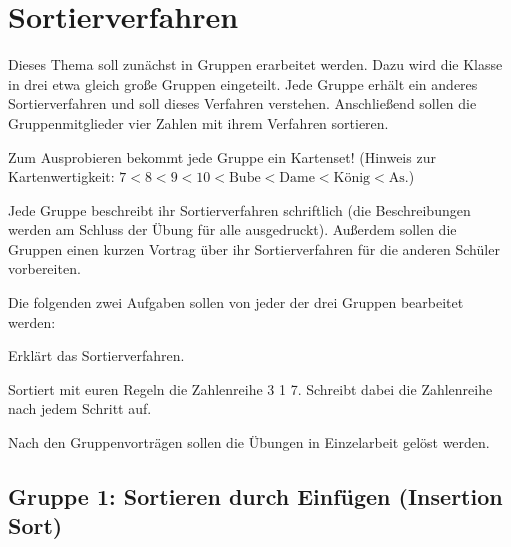 \chapter{Sortierverfahren \tagZusatz}
\renewcommand{\chaptertitle}{Sortierverfahren}

\lehead[]{\normalfont\sffamily\hspace*{-2.00cm}\textcolor{white}{\colorbox{lightblue}{\makebox[1.60cm][r]{\thechapter}}}\hspace{0.17cm}\textcolor{lightblue}{\chaptertitle}}
\rohead[]{\textcolor{lightblue}{\chaptertitle}\normalfont\sffamily\hspace*{0.17cm}\textcolor{white}{\colorbox{lightblue}{\makebox[1.60cm][l]{\thechapter}}}\hspace{-2.00cm}}
\rehead[]{\textcolor{lightblue}{AvHG, Inf, My}}
\lohead[]{\textcolor{lightblue}{AvHG, Inf, My}}

\lstset{style=myJava}

Dieses Thema soll zunächst in Gruppen erarbeitet werden. Dazu wird die Klasse in
drei etwa gleich große Gruppen eingeteilt. Jede Gruppe erhält ein anderes
Sortierverfahren und soll dieses Verfahren verstehen. Anschließend sollen die
Gruppenmitglieder vier Zahlen mit ihrem Verfahren sortieren.

Zum Ausprobieren bekommt jede Gruppe ein Kartenset! (Hinweis zur
Kartenwertigkeit: $7 < 8 < 9 < 10 < \text{Bube} < \text{Dame} < \text{König} < \text{As}$.)

Jede Gruppe beschreibt ihr Sortierverfahren schriftlich (die Beschreibungen
werden am Schluss der Übung für alle ausgedruckt). Außerdem sollen die Gruppen
einen kurzen Vortrag über ihr Sortierverfahren für die anderen Schüler
vorbereiten.

Die folgenden zwei Aufgaben sollen von jeder der drei Gruppen bearbeitet werden:

\begin{compactenum}[a)]
\item Erklärt das Sortierverfahren.
\item Sortiert mit euren Regeln die Zahlenreihe  3 1 7\grqq . Schreibt dabei die Zahlenreihe nach jedem Schritt auf.
\end{compactenum}

Nach den Gruppenvorträgen sollen die Übungen in Einzelarbeit gelöst werden.

\clearpage

\section{Gruppe 1: Sortieren durch Einfügen (Insertion Sort)}

